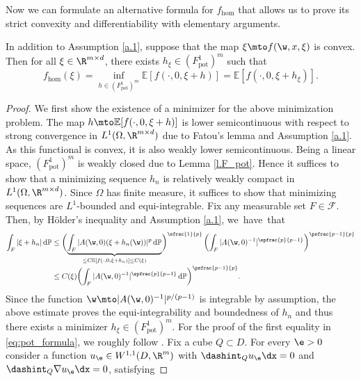 Now we can formulate an alternative formula for $f_{\hom}$ that allows us to prove its strict convexity and differentiability with elementary arguments.
\begin{lemma}\label{l.F_pot_formula}
In addition to Assumption \ref{a.1}, suppose that the map $\xi\mto f(\w,x,\xi)$ is convex. Then for all $\xi\in\R^{m\times d}$, there exists $h_{\xi}\in (F_\mathrm{pot}^1)^m$ such that
\begin{equation}\label{eq:pot_formula}
f_{\hom}(\xi)=\inf_{h\in (F_\mathrm{pot}^1)^m}\mathbb{E}[f(\cdot,0,\xi+h)]= \mathbb{E}[f(\cdot,0,\xi+h_{\xi})].
\end{equation}
\end{lemma}
\begin{proof}
We first show the existence of a minimizer for the above minimization problem. The map $h\mto \mathbb{E}[f(\cdot,0,\xi+h)]$ is lower semicontinuous with respect to strong convergence in $L^1(\Omega,\R^{m\times d})$ due to Fatou's lemma and Assumption \ref{a.1}. As this functional is convex, it is also weakly lower semicontinuous. Being a linear space, $(F_\mathrm{pot}^1)^m$ is weakly closed due to Lemma \ref{l.F_pot}. Hence it suffices to show that a minimizing sequence $h_n$ is relatively weakly compact in $L^1(\Omega,\R^{m\times d})$. Since $\Omega$ has finite measure, it suffices to show that minimizing sequences are $L^1$-bounded and equi-integrable. Fix any measurable set $F\!\in\!\mathcal{F}$. Then, by Hölder's inequality and Assumption \ref{a.1}, we~have~that\vspace*{-3pt}\enlargethispage{\baselineskip}%
\begin{align*}
\int_F |\xi+h_n|\,\mathrm{d}\mathbb{P}&\leq \biggl(\underbrace{\int_F|A(\w,0)(\xi+h_n(\w))|^p\,\mathrm{d}\mathbb{P}}_{\leq C\mathbb{E}[f(\cdot,0,\xi+h_n)]\leq C(\xi)}\biggr)^{\sfrac{1}{p}}\left(\int_F |A(\w,0)^{-1}|^{\spfrac{p}{p-1}}\right)^{\psfrac{p-1}{p}}
\\[-2pt]
&\leq C(\xi)\biggl(\int_F |A(\w,0)^{-1}|^{\spfrac{p}{p-1}}\,\mathrm{d}\mathbb{P}\biggr)^{\psfrac{p-1}{p}}.
\end{align*}
Since the function $\w\mto |A(\w,0)^{-1}|^{p/(p-1)}$ is integrable by assumption, the above estimate proves the equi-integrability and boundedness of $h_n$ and thus there exists a minimizer $h_{\xi}\in (F_\mathrm{pot}^1)^m$. For the proof of the first equality in \eqref{eq:pot_formula}, we roughly follow \cite{DG_unbounded}.
Fix a cube $Q\subset D$. For every $\e>0$ consider a function $u_{\e}\in W^{1,1}(D,\R^m)$ with $\dashint_Q u_{\e}\dx=0$ and $\dashint_Q\nabla u_{\e}\dx=0$, satisfying\vspace*{-3pt}

\end{proof}
